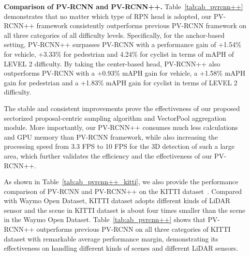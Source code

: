 \documentclass[natbib,twocolumn]{svjour3}          \smartqed  \usepackage{graphicx}
\begin{document}
\begin{table}
	\begin{center}
	\end{center}
	\vspace{-2mm}
	\caption{Performance comparison of PV-RCNN and PV-RCNN++ on the test set of KITTI dataset. The results are evaluated by the most important moderate difficulty level of KITTI evaluation metric by submitting to the official KITTI evaluation server.
	}
	\label{tab:ab_pvrcnn++_kitti}
	\vspace{-2mm}
\end{table}


\noindent
\textbf{Comparison of PV-RCNN and PV-RCNN++.}
Table~\ref{tab:ab_pvrcnn++} demonstrates that no matter which type of RPN head is adopted, our PV-RCNN++ framework consistently outperforms previous PV-RCNN framework on all three categories of all difficulty levels. 
Specifically, for the anchor-based setting, PV-RCNN++ surpasses PV-RCNN with a performance gain of +1.54\% for vehicle, +3.33\% for pedestrian and 4.24\% for cyclist in terms of mAPH of LEVEL 2 difficulty. 
By taking the center-based head, PV-RCNN++ also outperforms PV-RCNN with a +0.93\% mAPH gain for vehicle, a +1.58\% mAPH gain for pedestrian and a +1.83\% mAPH gain for cyclist in terms of LEVEL 2 difficulty. 


The stable and consistent improvements prove the effectiveness of our proposed sectorized proposal-centric sampling algorithm and VectorPool aggregation module. 
More importantly, our PV-RCNN++ consumes much less calculations and GPU memory than PV-RCNN framework, while also increasing the processing speed from 3.3 FPS to 10 FPS for the 3D detection of  such a large area, which further validates the efficiency and the effectiveness of our PV-RCNN++. 

As shown in Table~\ref{tab:ab_pvrcnn++_kitti}, we also provide the performance comparison of PV-RCNN and PV-RCNN++ on the KITTI dataset~\citep{Geiger2012CVPR}. Compared with Waymo Open Dataset, KITTI dataset adopts different kinds of LiDAR sensor and the scene in KITTI dataset is about four times smaller than the scene in the Waymo Open Dataset. 
Table~\ref{tab:ab_pvrcnn++} shows that PV-RCNN++ outperforms previous PV-RCNN on all three categories of KITTI dataset with remarkable average performance margin, demonstrating its effectiveness on handling different kinds of scenes and different LiDAR sensors. 
\end{document}
